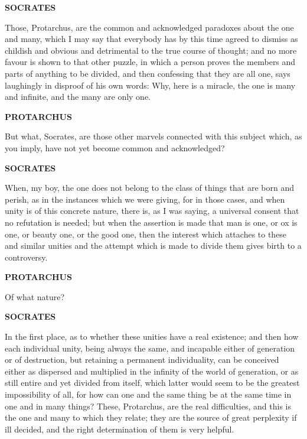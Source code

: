 \documentclass[11pt,letter]{article}
\begin{document}
\par \textbf{SOCRATES}
\par   Those, Protarchus, are the common and acknowledged paradoxes about the one and many, which I may say that everybody has by this time agreed to dismiss as childish and obvious and detrimental to the true course of thought; and no more favour is shown to that other puzzle, in which a person proves the members and parts of anything to be divided, and then confessing that they are all one, says laughingly in disproof of his own words:  Why, here is a miracle, the one is many and infinite, and the many are only one.

\par \textbf{PROTARCHUS}
\par   But what, Socrates, are those other marvels connected with this subject which, as you imply, have not yet become common and acknowledged?

\par \textbf{SOCRATES}
\par   When, my boy, the one does not belong to the class of things that are born and perish, as in the instances which we were giving, for in those cases, and when unity is of this concrete nature, there is, as I was saying, a universal consent that no refutation is needed; but when the assertion is made that man is one, or ox is one, or beauty one, or the good one, then the interest which attaches to these and similar unities and the attempt which is made to divide them gives birth to a controversy.

\par \textbf{PROTARCHUS}
\par   Of what nature?

\par \textbf{SOCRATES}
\par   In the first place, as to whether these unities have a real existence; and then how each individual unity, being always the same, and incapable either of generation or of destruction, but retaining a permanent individuality, can be conceived either as dispersed and multiplied in the infinity of the world of generation, or as still entire and yet divided from itself, which latter would seem to be the greatest impossibility of all, for how can one and the same thing be at the same time in one and in many things? These, Protarchus, are the real difficulties, and this is the one and many to which they relate; they are the source of great perplexity if ill decided, and the right determination of them is very helpful.
\end{document}
